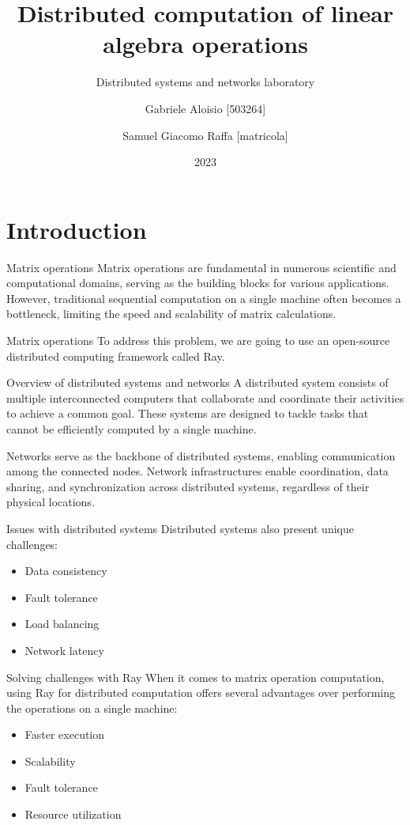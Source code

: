 \documentclass{beamer}
\title{Distributed computation of linear algebra operations}
\subtitle{Distributed systems and networks laboratory}
\author{
    Gabriele Aloisio [503264] \and
    Samuel Giacomo Raffa [matricola]
    }
\institute{Università degli studi di Messina}
\date{2023}
\begin{document}
\maketitle

\section{Introduction}
\begin{frame}{Matrix operations}
    Matrix operations are fundamental in numerous scientific and computational domains, serving as the building blocks for various applications. However, traditional sequential computation on a single machine often becomes a bottleneck, limiting the speed and scalability of matrix calculations.
\end{frame}

\begin{frame}{Matrix operations}
    To address this problem, we are going to use an open-source distributed computing framework called \alert{Ray}.
\end{frame}

\begin{frame}{Overview of distributed systems and networks}
    A \alert{distributed system} consists of multiple interconnected computers that collaborate and coordinate their activities to achieve a common goal. These systems are designed to tackle  tasks that cannot be efficiently computed by a single machine.

    \alert{Networks} serve as the backbone of distributed systems, enabling communication among the connected nodes. Network infrastructures enable coordination, data sharing, and synchronization across distributed systems, regardless of their physical locations.
\end{frame}


\begin{frame}{Issues with distributed systems}
    Distributed systems also present unique challenges:
    \begin{itemize}
        \item{Data consistency}
        \item {Fault tolerance}
        \item {Load balancing}
        \item {Network latency}
    \end{itemize}
\end{frame}

\begin{frame}{Solving challenges with Ray}
    When it comes to matrix operation computation, using Ray for distributed computation offers several advantages over performing the operations on a single machine:
    \begin{itemize}
        \item Faster execution
        \item Scalability
        \item Fault tolerance
        \item Resource utilization
    \end{itemize}
\end{frame}
\end{document}
